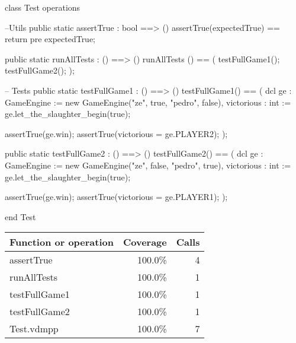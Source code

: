 \begin{vdm_al}
class Test
 operations
 
  --Utils
     public static assertTrue : bool ==> ()
         assertTrue(expectedTrue) == return
     pre expectedTrue;
     
     public static runAllTests : () ==> ()
        runAllTests () == (
         testFullGame1();
         testFullGame2();
        );
        
        -- Tests
        public static testFullGame1 : () ==> ()
         testFullGame1() == (
    dcl ge : GameEngine := new GameEngine("ze", true, "pedro", false),
     victorious : int := ge.let_the_slaughter_begin(true);
    
    assertTrue(ge.win);
    assertTrue(victorious = ge.PLAYER2);
   );
        
        public static testFullGame2 : () ==> ()
         testFullGame2() == (
    dcl ge : GameEngine := new GameEngine("ze", false, "pedro", true),
     victorious : int := ge.let_the_slaughter_begin(true);
    
    assertTrue(ge.win);
    assertTrue(victorious = ge.PLAYER1);
   );
        
end Test
\end{vdm_al}
\bigskip
\begin{longtable}{|l|r|r|}
\hline
Function or operation & Coverage & Calls \\
\hline
\hline
assertTrue & 100.0\% & 4 \\
\hline
runAllTests & 100.0\% & 1 \\
\hline
testFullGame1 & 100.0\% & 1 \\
\hline
testFullGame2 & 100.0\% & 1 \\
\hline
\hline
Test.vdmpp & 100.0\% & 7 \\
\hline
\end{longtable}

